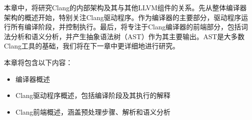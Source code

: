 本章中，将研究Clang的内部架构及其与其他LLVM组件的关系。先从整体编译器架构的概述开始，特别关注Clang驱动程序。作为编译器的主要部分，驱动程序运行所有编译阶段，并控制执行。最后，将专注于Clang编译器的前端部分，包括词法分析和语义分析，并产生抽象语法树（AST）作为其主要输出。AST是大多数Clang工具的基础，我们将在下一章中更详细地进行研究。

本章将包含以下内容：

\begin{itemize}
\item
编译器概述

\item
Clang驱动程序概述，包括编译阶段及其执行的解释

\item
Clang前端概述，涵盖预处理步骤、解析和语义分析
\end{itemize}